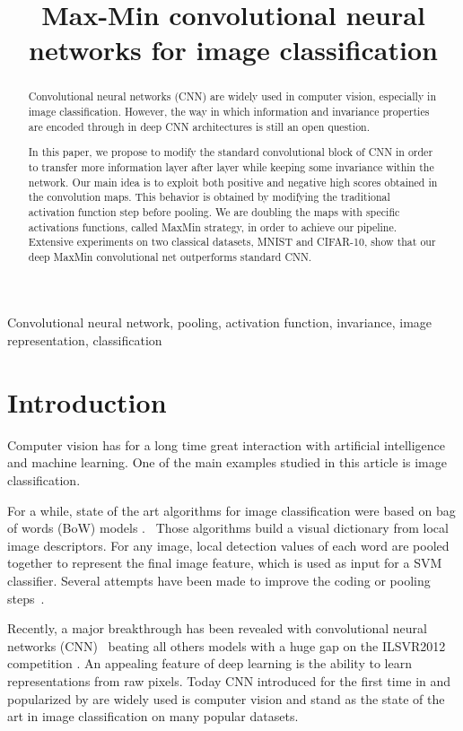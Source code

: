 \documentclass{article}
\title{Max-Min convolutional neural networks for image classification}
\begin{document}
%
\maketitle
%
\begin{abstract}
Convolutional neural networks (CNN) are widely used in computer vision, especially in image classification. 
However, the way in which information and invariance properties are encoded through in deep CNN architectures is still an open question.

 In this paper, we propose to modify the standard convolutional block of CNN in order to transfer more information layer after layer while keeping some invariance within the network. Our main idea is to exploit both positive and negative high scores obtained in the convolution maps. This behavior is obtained by modifying the traditional activation function step before pooling. We are doubling the maps with specific activations functions, called MaxMin strategy, in order to achieve our pipeline. Extensive experiments on two classical datasets, MNIST and CIFAR-10, show that our deep MaxMin convolutional net outperforms standard CNN.
\end{abstract}
%
\begin{keywords}
Convolutional neural network, pooling, activation function, invariance, image representation, classification
\end{keywords}
%
\section{Introduction}
\label{sec:intro}

Computer vision has for a long time great interaction with artificial intelligence and machine learning. One of the main examples studied in this article is image classification.  

For a while, state of the art algorithms for image classification were based on bag of words (BoW) models \cite{bow1} \cite{bow2}.
~Those algorithms build a visual dictionary from local image descriptors. For any image, local detection values of each word are pooled together to represent the final image feature, which is used as input for a SVM \cite{svm} classifier.
Several attempts have been made to improve the coding or pooling steps~\cite{DBLP:conf/cvpr/PerronninD07,Goh_NIPS13,GohTNNLS14,avilaCVIU2013}.

Recently, a major breakthrough has been revealed with convolutional neural networks (CNN)~\cite{alexnet} beating all others models with a huge gap on the ILSVR2012 competition \cite{lsvrc2012}. 
An appealing feature of deep learning is the ability to learn representations from raw pixels. 
Today CNN introduced for the first time in \cite{convnet1} and popularized by \cite{convnet2} are widely 
used is computer vision and stand as the state of the art in image classification on many popular datasets. 
\end{document}
